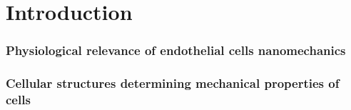 \part{Introduction}

\section{Physiological relevance of endothelial cells nanomechanics}

\section{Cellular structures determining mechanical properties of cells}
